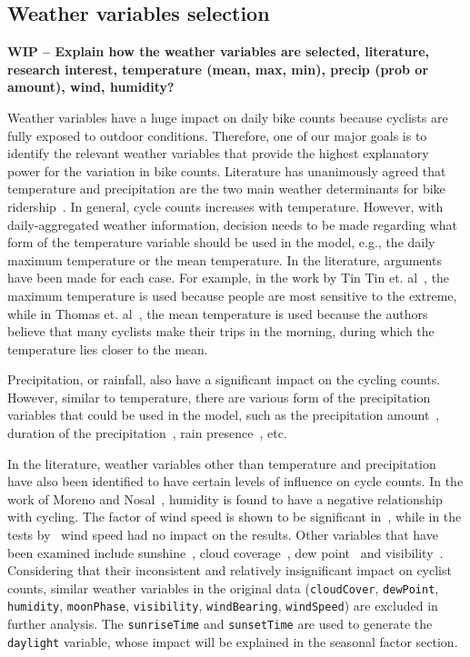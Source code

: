 \documentclass [11pt, proquest] {uwthesis}[2015/03/03]
\begin{document}
\subsection{Weather variables selection}
\textbf{WIP -- Explain how the weather variables are selected, literature, research interest, temperature (mean, max, min), precip (prob or amount), wind, humidity?}

Weather variables have a huge impact on daily bike counts because cyclists are fully exposed to outdoor conditions. Therefore, one of our major goals is to identify the relevant weather variables that provide the highest explanatory power for the variation in bike counts. Literature has unanimously agreed that temperature and precipitation are the two main weather determinants for bike ridership~\cite{Nosal:2014aa,Tin:2012aa}. In general, cycle counts increases with temperature. However, with daily-aggregated weather information, decision needs to be made regarding what form of the temperature variable should be used in the model, e.g., the daily maximum temperature or the mean temperature. In the literature, arguments have been made for each case. For example, in the work by Tin Tin et. al~\cite{Tin:2012aa}, the maximum temperature is used because people are most sensitive to the extreme, while in Thomas et. al~\cite{Thomas09}, the mean temperature is used because the authors believe that many cyclists make their trips in the morning, during which the temperature lies closer to the mean.

Precipitation, or rainfall, also have a significant impact on the cycling counts. However, similar to temperature, there are various form of the precipitation variables that could be used in the model, such as the precipitation amount~\cite{Ahmed12}, duration of the precipitation~\cite{Thomas09}, rain presence~\cite{Miranda-Moreno:2011aa}, etc.

In the literature, weather variables other than temperature and precipitation have also been identified to have certain levels of influence on cycle counts. In the work of Moreno and Nosal~\cite{Miranda-Moreno:2011aa}, humidity is found to have a negative relationship with cycling. The factor of wind speed is shown to be significant in~\cite{Thomas12}, while in the tests by~\cite{Miranda-Moreno:2011aa} wind speed had no impact on the results. Other variables that have been examined include sunshine~\cite{Thomas12}, cloud coverage~\cite{Hanson77}, dew point~\cite{Schade14,Nosal:2014aa} and visibility~\cite{Thomas09}. Considering that their inconsistent and relatively insignificant impact on cyclist counts, similar weather variables in the original data (\texttt{cloudCover}, \texttt{dewPoint}, \texttt{humidity}, \texttt{moonPhase}, \texttt{visibility}, \texttt{windBearing}, \texttt{windSpeed}) are excluded in further analysis. The \texttt{sunriseTime} and \texttt{sunsetTime} are used to generate the \texttt{daylight} variable, whose impact will be explained in the seasonal factor section. 
\end{document}
